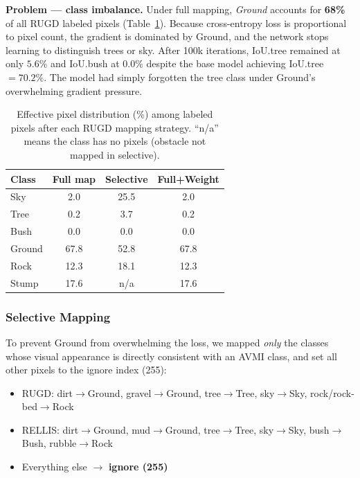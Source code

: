 \textbf{Problem --- class imbalance.}  Under full mapping, \textit{Ground}
accounts for \textbf{68\%} of all RUGD labeled pixels (Table~\ref{tab:dist}).
Because cross-entropy loss is proportional to pixel count, the gradient is
dominated by Ground, and the network stops learning to distinguish trees or
sky.  After 100k iterations, IoU.tree remained at only $5.6\%$ and
IoU.bush at $0.0\%$ despite the base model achieving IoU.tree $= 70.2\%$.
The model had simply forgotten the tree class under Ground's overwhelming
gradient pressure.

\begin{table}[h]
\centering
\caption{Effective pixel distribution (\%) among labeled pixels after each
         RUGD mapping strategy.  ``n/a'' means the class has no pixels
         (obstacle not mapped in selective).}
\label{tab:dist}
\begin{tabular}{lccc}
\toprule
\textbf{Class} & \textbf{Full map} & \textbf{Selective} & \textbf{Full+Weight} \\
\midrule
Sky      &  2.0 & 25.5 &  2.0 \\
Tree     &  0.2 &  3.7 &  0.2 \\
Bush     &  0.0 &  0.0 &  0.0 \\
Ground   & 67.8 & 52.8 & 67.8 \\
Rock     & 12.3 & 18.1 & 12.3 \\
Stump    & 17.6 &  n/a & 17.6 \\
\bottomrule
\end{tabular}
\end{table}

\subsubsection{Selective Mapping}

To prevent Ground from overwhelming the loss, we mapped \emph{only} the
classes whose visual appearance is directly consistent with an AVMI class,
and set all other pixels to the ignore index (255):
\begin{itemize}
    \item RUGD: dirt$\to$Ground, gravel$\to$Ground, tree$\to$Tree,
          sky$\to$Sky, rock/rock-bed$\to$Rock
    \item RELLIS: dirt$\to$Ground, mud$\to$Ground, tree$\to$Tree,
          sky$\to$Sky, bush$\to$Bush, rubble$\to$Rock
    \item Everything else $\to$ \textbf{ignore (255)}
\end{itemize}

